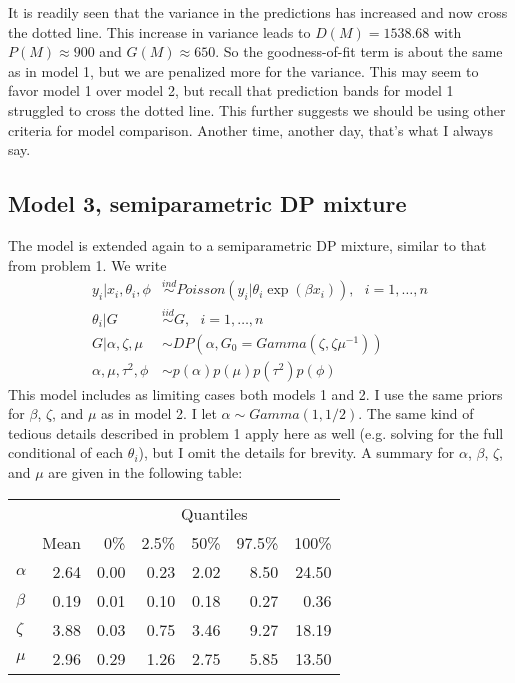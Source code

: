 \documentclass[12pt]{article}
\begin{document}
It is readily seen that the variance in the predictions has increased and now cross the dotted line. This increase in variance leads to $D(M)=1538.68$ with $P(M) \approx 900$ and $G(M) \approx 650$. So the goodness-of-fit term is about the same as in model 1, but we are penalized more for the variance. This may seem to favor model 1 over model 2, but recall that prediction bands for model 1 struggled to cross the dotted line. This further suggests we should be using other criteria for model comparison. Another time, another day, that's what I always say.

\subsection*{Model 3, semiparametric DP mixture}

The model is extended again to a semiparametric DP mixture, similar to that from problem 1. We write
\begin{align*}
y_i|x_i,\theta_i,\phi &\overset{ind}\sim Poisson(y_i|\theta_i\exp(\beta x_i)),~~~i=1,\ldots,n \\
\theta_i|G &\overset{iid}\sim G,~~~i=1,\ldots,n \\
G|\alpha,\zeta,\mu &\sim DP(\alpha, G_0=Gamma(\zeta,\zeta\mu^{-1})) \\
\alpha,\mu,\tau^2,\phi &\sim p(\alpha)p(\mu)p(\tau^2)p(\phi) 
\end{align*}
This model includes as limiting cases both models 1 and 2. I use the same priors for $\beta$, $\zeta$, and $\mu$ as in model 2. I let $\alpha\sim Gamma(1, 1/2)$. The same kind of tedious details described in problem 1 apply here as well (e.g. solving for the full conditional of each $\theta_i$), but I omit the details for brevity. A summary for $\alpha$, $\beta$, $\zeta$, and $\mu$ are given in the following table:
\begin{center}
\begin{tabular}{lrrrrrr}
         &      & \multicolumn{5}{c}{Quantiles} \\
         & Mean & \multicolumn{1}{|r}{0\%}  & 2.5\% & 50\% & 97.5\% & 100\% \\ \hline\hline
$\alpha$ & 2.64 & 0.00 & 0.23 & 2.02 & 8.50 & 24.50 \\ 
$\beta$ & 0.19 & 0.01 & 0.10 & 0.18 & 0.27 &  0.36 \\
$\zeta$ & 3.88 & 0.03 & 0.75 & 3.46 & 9.27 & 18.19 \\
$\mu$   & 2.96 & 0.29 & 1.26 & 2.75 & 5.85 & 13.50 \\ \hline
\end{tabular}
\end{center}
\end{document}
